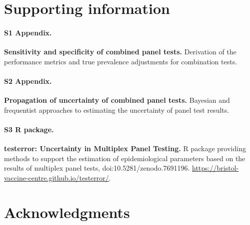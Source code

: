 \documentclass[10pt,letterpaper]{article}
\begin{document}
\section*{Supporting information}


\paragraph*{S1 Appendix.}
\label{S1_Appendix}
{\bf Sensitivity and specificity of combined panel tests.} Derivation of the performance metrics and true prevalence adjustments for combination tests.

\paragraph*{S2 Appendix.}
\label{S2_Appendix}
{\bf Propagation of uncertainty of combined panel tests.} Bayesian and frequentist approaches to estimating the uncertainty of panel test results.

\paragraph*{S3 R package.}
\label{S3_Github}
{\bf testerror: Uncertainty in Multiplex Panel Testing.}  R package providing methods to support the estimation of epidemiological parameters based on the results of multiplex panel tests, doi:10.5281/zenodo.7691196. \url{https://bristol-vaccine-centre.github.io/testerror/}.

\section*{Acknowledgments}


\nolinenumbers


\end{document}
